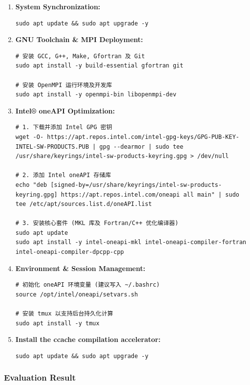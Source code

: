 \begin{enumerate}

    \item \textbf{System Synchronization:}
    \begin{lstlisting}
sudo apt update && sudo apt upgrade -y
    \end{lstlisting}

    \item \textbf{GNU Toolchain \& MPI Deployment:}
    \begin{lstlisting}
# 安装 GCC, G++, Make, Gfortran 及 Git
sudo apt install -y build-essential gfortran git

# 安装 OpenMPI 运行环境及开发库
sudo apt install -y openmpi-bin libopenmpi-dev
    \end{lstlisting}

    \item \textbf{Intel® oneAPI Optimization:}
    \begin{lstlisting}
# 1. 下载并添加 Intel GPG 密钥
wget -O- https://apt.repos.intel.com/intel-gpg-keys/GPG-PUB-KEY-INTEL-SW-PRODUCTS.PUB | gpg --dearmor | sudo tee /usr/share/keyrings/intel-sw-products-keyring.gpg > /dev/null

# 2. 添加 Intel oneAPI 存储库
echo "deb [signed-by=/usr/share/keyrings/intel-sw-products-keyring.gpg] https://apt.repos.intel.com/oneapi all main" | sudo tee /etc/apt/sources.list.d/oneAPI.list

# 3. 安装核心套件 (MKL 库及 Fortran/C++ 优化编译器)
sudo apt update
sudo apt install -y intel-oneapi-mkl intel-oneapi-compiler-fortran intel-oneapi-compiler-dpcpp-cpp
    \end{lstlisting}

    \item \textbf{Environment \& Session Management:}
    \begin{lstlisting}
# 初始化 oneAPI 环境变量 (建议写入 ~/.bashrc)
source /opt/intel/oneapi/setvars.sh

# 安装 tmux 以支持后台持久化计算
sudo apt install -y tmux
    \end{lstlisting}

    \item \textbf{Install the ccache compilation accelerator:}
    \begin{lstlisting}
sudo apt update && sudo apt upgrade -y
    \end{lstlisting}

\end{enumerate} %
\subsubsection{Evaluation Result}
\ 

